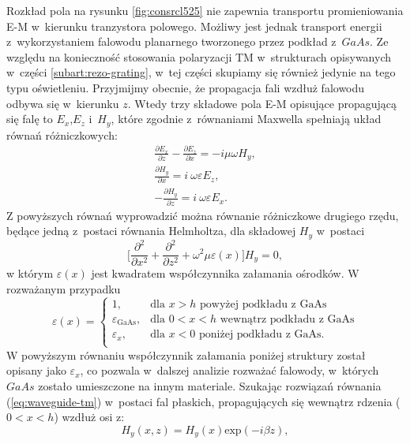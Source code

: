 Rozkład pola na rysunku \ref{fig:consrcl525} nie zapewnia transportu promieniowania E-M w~kierunku tranzystora polowego. Możliwy jest jednak transport energii z~wykorzystaniem falowodu planarnego tworzonego przez podkład z~$GaAs$. Ze względu na konieczność stosowania polaryzacji TM w~strukturach opisywanych w~części \ref{subart:rezo-grating}, w~tej części skupiamy się również jedynie na tego typu oświetleniu. Przyjmijmy obecnie, że propagacja fali wzdłuż falowodu odbywa się w~kierunku $z$. Wtedy trzy składowe pola E-M opisujące propagującą się falę to $E_x$,$E_z$ i~$H_y$, które zgodnie z~równaniami Maxwella spełniają układ równań różniczkowych:
\begin{equation}
\begin{gathered}
	\frac{\partial E_x}{\partial z} - \frac{\partial E_z}{\partial x} = -i \mu \omega H_y,\\	
	\frac{\partial H_y}{\partial x} = i~\omega \varepsilon E_z, \\
	- \frac{\partial H_y}{\partial z} = i~\omega \varepsilon E_x.
\end{gathered}
\end{equation}
Z powyższych równań wyprowadzić można równanie różniczkowe drugiego rzędu, będące jedną z~postaci równania Helmholtza, dla składowej $H_y$ w~postaci
\begin{equation}
	\Bigg[ \frac{\partial^2}{\partial x^2} + \frac{\partial^2}{\partial z^2} + \omega^2 \mu \varepsilon (x) \Bigg] H_y = 0,
	\label{eq:waveguide-tm}
\end{equation}
w którym $\varepsilon(x)$ jest kwadratem współczynnika załamania ośrodków. W rozważanym przypadku
\begin{equation}
\varepsilon(x)=  
\begin{cases} 
	1, & \mbox{dla } x>h\mbox{ powyżej podkładu z~GaAs } \\ 
	\varepsilon_{\textrm{GaAs}}, & \mbox{dla } 0<x<h\mbox{ wewnątrz podkładu z~GaAs} \\
	\varepsilon_x,	&	\mbox{dla } x<0\mbox{ poniżej podkładu z~GaAs}.\\
\end{cases}
\end{equation}
W powyższym równaniu współczynnik załamania poniżej struktury został opisany jako $\varepsilon_x$, co pozwala w~dalszej analizie rozważać falowody, w~których $GaAs$ zostało umieszczone na innym materiale. Szukając rozwiązań równania (\ref{eq:waveguide-tm}) w~postaci fal płaskich, propagujących się wewnątrz rdzenia ($0<x<h$) wzdłuż osi z:
\begin{equation}
	H_y(x,z)=H_y(x) \textrm{exp}(-i \beta z),
\end{equation}
